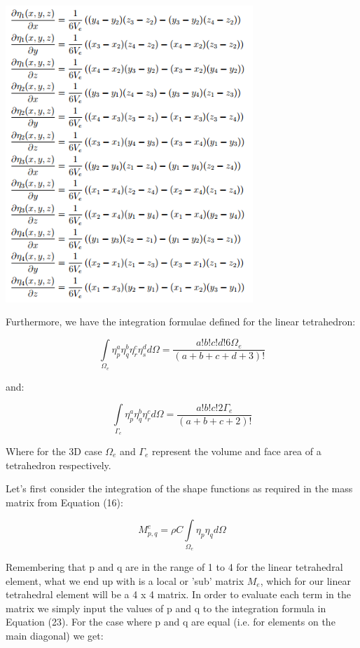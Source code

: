 \documentclass[12pt]{article}
\begin{document}
\begin{center}
  \includegraphics[width=0.7\textwidth]{GradientShapeFunctions}
\end{center}

Furthermore, we have the integration formulae defined for the linear tetrahedron:

\begin{equation}
 \int\limits_{\Omega_e} \eta_p^a \eta_q^b \eta_r^c \eta_s^d d{\Omega}=
 \frac{a!b!c!d!6\Omega_e}{(a+b+c+d+3)!}
\end{equation}

and:

\begin{equation}
 \int\limits_{\Gamma_e} \eta_p^a \eta_q^b \eta_r^c  d{\Omega}=
 \frac{a!b!c!2\Gamma_e}{(a+b+c+2)!}
\end{equation}

Where for the 3D case $\Omega_e$ and $\Gamma_e$ represent the volume and face area of a tetrahedron respectively.

Let's first
consider the integration of the shape functions as required in the mass matrix from Equation (16):

$$
M_{p,q}^e = \rho C \int\limits_{\Omega_e} \eta_p \eta_q d\Omega
$$

Remembering that p and q are in the range of 1 to 4 for the linear tetrahedral element,
what we end up with is a local or 'sub' matrix $M_e$, which for our linear tetrahedral
element will be a 4 x 4 matrix. In order to evaluate each term in the matrix we
simply input the values of p and q to the integration formula in Equation (23). For
the case where p and q are equal (i.e. for elements on the main diagonal) we get:
\end{document}
